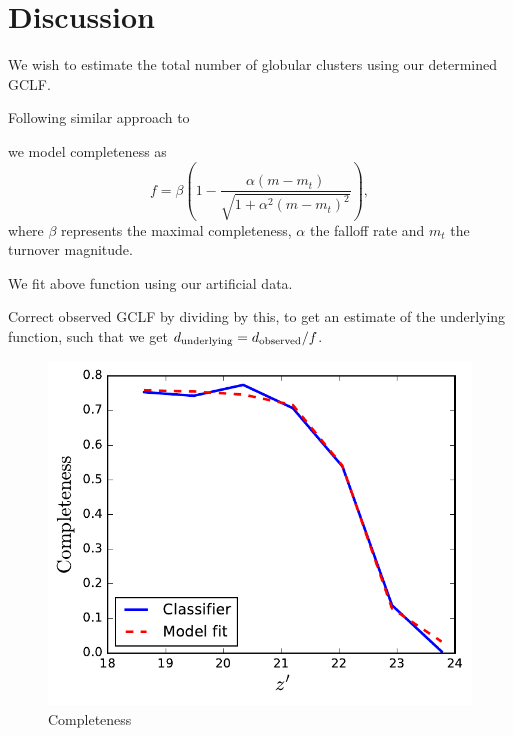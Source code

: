 \documentclass[useAMS,usenatbib]{mn2e}
\begin{document}
\section{Discussion}
\label{sec:discussion}



We wish to estimate the total number of globular clusters using our determined GCLF. 

Following similar approach to \citet{Wehner2008, Alamo2012, Salinas2015}

we model completeness as
\begin{equation}
f = \beta \left( 1 - \frac{\alpha(m - m_t)}{\sqrt{1 + \alpha^2 (m -m_t)^2}} \right),
\end{equation}
where $\beta$ represents the maximal completeness, $\alpha$ the falloff rate and $m_t$ the turnover magnitude.

We fit above function using our artificial data.

Correct observed GCLF by dividing by this, to get an estimate of the underlying function, such that we get $d_{\rm{underlying}} = d_{\rm{observed}} / f$.




\begin{figure}
	\includegraphics[width=\columnwidth]{images/completeness.pdf}
	\caption{Completeness}
	\label{fig:completeness}
\end{figure}
\end{document}
